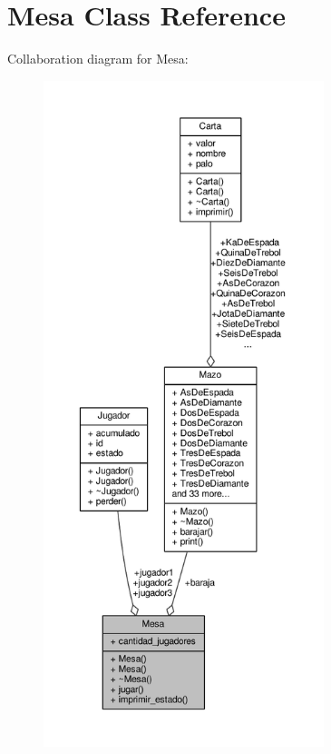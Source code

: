 \hypertarget{class_mesa}{\section{Mesa Class Reference}
\label{class_mesa}
}


Collaboration diagram for Mesa\+:
\nopagebreak
\begin{figure}[H]
\begin{center}
\leavevmode
\includegraphics[height=550pt]{class_mesa__coll__graph}
\end{center}
\end{figure}
